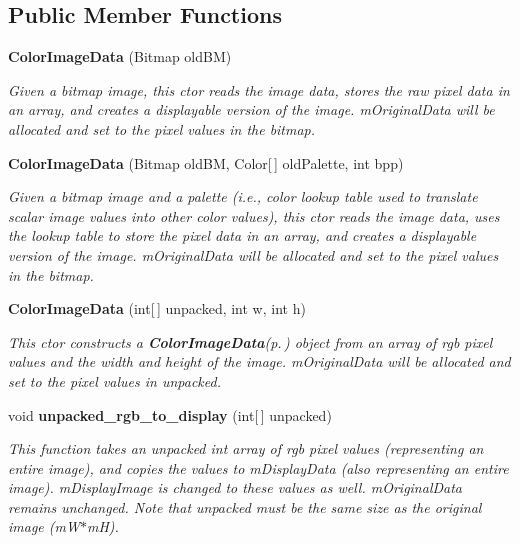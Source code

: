 \subsection*{Public Member Functions}
\begin{CompactItemize}
\item 
{\bf Color\-Image\-Data} (Bitmap old\-BM)
\begin{CompactList}\small\item\em Given a bitmap image, this ctor reads the image data, stores the raw pixel data in an array, and creates a displayable version of the image. m\-Original\-Data will be allocated and set to the pixel values in the bitmap. \item\end{CompactList}\item 
{\bf Color\-Image\-Data} (Bitmap old\-BM, Color[$\,$] old\-Palette, int bpp)
\begin{CompactList}\small\item\em Given a bitmap image and a palette (i.e., color lookup table used to translate scalar image values into other color values), this ctor reads the image data, uses the lookup table to store the pixel data in an array, and creates a displayable version of the image. m\-Original\-Data will be allocated and set to the pixel values in the bitmap. \item\end{CompactList}\item 
{\bf Color\-Image\-Data} (int[$\,$] unpacked, int w, int h)
\begin{CompactList}\small\item\em This ctor constructs a {\bf Color\-Image\-Data}{\rm (p.\,\pageref{class_c_s_image_viewer_1_1_color_image_data})} object from an array of rgb pixel values and the width and height of the image. m\-Original\-Data will be allocated and set to the pixel values in unpacked. \item\end{CompactList}\item 
void {\bf unpacked\_\-rgb\_\-to\_\-display} (int[$\,$] unpacked)
\begin{CompactList}\small\item\em This function takes an unpacked int array of rgb pixel values (representing an entire image), and copies the values to m\-Display\-Data (also representing an entire image). m\-Display\-Image is changed to these values as well. m\-Original\-Data remains unchanged. Note that unpacked must be the same size as the original image (m\-W$\ast$m\-H). \item\end{CompactList}\item 

\end{CompactItemize}
